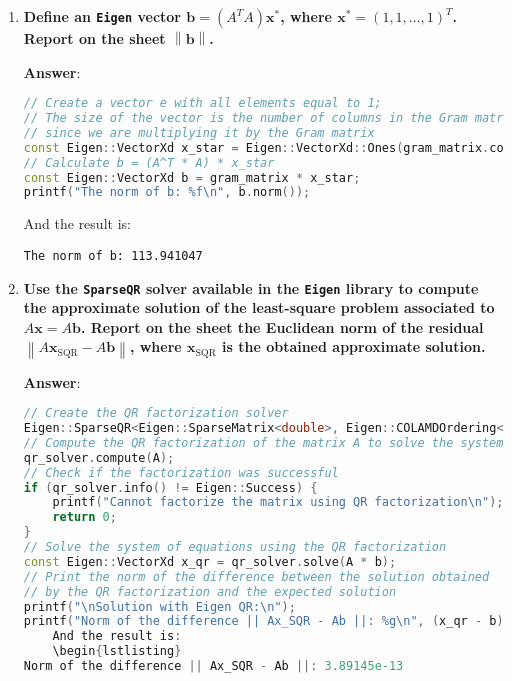 \begin{enumerate}[label=\textcolor{Green3}{\textbf{\arabic*.}}]
    \newpage

    \item \textcolor{Green3}{\textbf{%
        Define an \texttt{Eigen} vector $\mathbf{b} = \left(A^{T} A\right) \mathbf{x}^{*}$, where $\mathbf{x}^{*} = \left(1, 1, \dots, 1\right)^{T}$. Report on the sheet $\left\|\mathbf{b}\right\|$.
    }}

    \textbf{Answer}:
    \begin{lstlisting}[language=C++]
// Create a vector e with all elements equal to 1;
// The size of the vector is the number of columns in the Gram matrix,
// since we are multiplying it by the Gram matrix
const Eigen::VectorXd x_star = Eigen::VectorXd::Ones(gram_matrix.cols());
// Calculate b = (A^T * A) * x_star
const Eigen::VectorXd b = gram_matrix * x_star;
printf("The norm of b: %f\n", b.norm());
    \end{lstlisting}
    And the result is:
    \begin{lstlisting}
The norm of b: 113.941047\end{lstlisting}




    \item \textcolor{Green3}{\textbf{%
        Use the \texttt{SparseQR} solver available in the \texttt{Eigen} library to compute the approximate solution of the least-square problem associated to $A\mathbf{x} = A\mathbf{b}$. Report on the sheet the Euclidean norm of the residual $\left\| A\mathbf{x}_{\text{SQR}} - A\mathbf{b} \right\|$, where $\mathbf{x}_{\text{SQR}}$ is the obtained approximate solution.
    }}

    \textbf{Answer}:
    \begin{lstlisting}[language=C++]
// Create the QR factorization solver
Eigen::SparseQR<Eigen::SparseMatrix<double>, Eigen::COLAMDOrdering<int>> qr_solver;
// Compute the QR factorization of the matrix A to solve the system of equations Ax = Ab
qr_solver.compute(A);
// Check if the factorization was successful
if (qr_solver.info() != Eigen::Success) {
    printf("Cannot factorize the matrix using QR factorization\n");
    return 0;
}
// Solve the system of equations using the QR factorization
const Eigen::VectorXd x_qr = qr_solver.solve(A * b);
// Print the norm of the difference between the solution obtained
// by the QR factorization and the expected solution
printf("\nSolution with Eigen QR:\n");
printf("Norm of the difference || Ax_SQR - Ab ||: %g\n", (x_qr - b).norm());\end{lstlisting}
    And the result is:
    \begin{lstlisting}
Norm of the difference || Ax_SQR - Ab ||: 3.89145e-13\end{lstlisting}



\end{enumerate}
